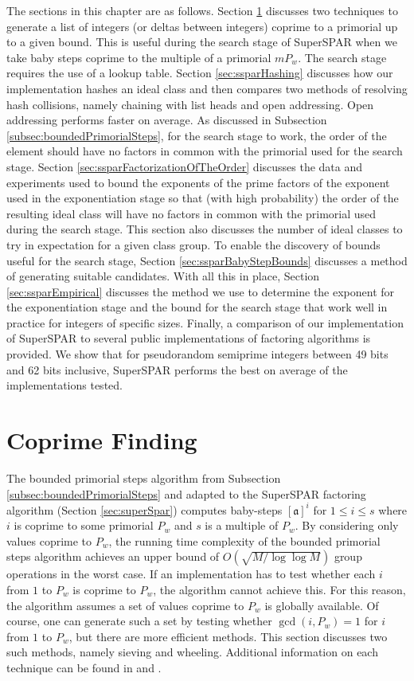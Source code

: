 \documentclass{ucalgthes1}
\theoremstyle{definition}
\newcommand{\ideal}{\mathfrak}
\newcommand{\idealclass}[1]{\left[ \ideal #1 \right]}
\newcommand{\aclass}{\idealclass a}
\begin{document}
The sections in this chapter are as follows.  Section \ref{sec:ssparCoprimeFinding} discusses two techniques to generate a list of integers (or deltas between integers) coprime to a primorial up to a given bound.  This is useful during the search stage of SuperSPAR when we take baby steps coprime to the multiple of a primorial $mP_w$.  The search stage requires the use of a lookup table.  Section \ref{sec:ssparHashing} discusses how our implementation hashes an ideal class and then compares two methods of resolving hash collisions, namely chaining with list heads and open addressing.  Open addressing performs faster on average.  As discussed in Subsection \ref{subsec:boundedPrimorialSteps}, for the search stage to work, the order of the element should have no factors in common with the primorial used for the search stage.  Section \ref{sec:ssparFactorizationOfTheOrder} discusses the data and experiments used to bound the exponents of the prime factors of the exponent used in the exponentiation stage so that (with high probability) the order of the resulting ideal class will have no factors in common with the primorial used during the search stage.  This section also discusses the number of ideal classes to try in expectation for a given class group.  To enable the discovery of bounds useful for the search stage, Section \ref{sec:ssparBabyStepBounds} discusses a method of generating suitable candidates.  With all this in place, Section \ref{sec:ssparEmpirical} discusses the method we use to determine the exponent for the exponentiation stage and the bound for the search stage that work well in practice for integers of specific sizes.  Finally, a comparison of our implementation of SuperSPAR to several public implementations of factoring algorithms is provided.  We show that for pseudorandom semiprime integers between 49 bits and 62 bits inclusive, SuperSPAR performs the best on average of the implementations tested.


\section{Coprime Finding}
\label{sec:ssparCoprimeFinding}

The bounded primorial steps algorithm from Subsection \ref{subsec:boundedPrimorialSteps} and adapted to the SuperSPAR factoring algorithm (Section \ref{sec:superSpar}) computes baby-steps $\aclass^i$ for $1 \le i \le s$ where $i$ is coprime to some primorial $P_w$ and $s$ is a multiple of $P_w$.  By considering only values coprime to $P_w$, the running time complexity of the bounded primorial steps algorithm achieves an upper bound of $O(\sqrt{M/\log \log M})$ group operations in the worst case.  If an implementation has to test whether each $i$ from $1$ to $P_w$ is coprime to $P_w$, the algorithm cannot achieve this.  For this reason, the algorithm assumes a set of values coprime to $P_w$ is globally available.  Of course, one can generate such a set by testing whether $\gcd(i, P_w) = 1$ for $i$ from $1$ to $P_w$, but there are more efficient methods.  This section discusses two such methods, namely sieving and wheeling.  Additional information on each technique can be found in \cite[pp.117--127]{Crandall2001} and \cite[p.494]{Sutherland2009}.
\end{document}
